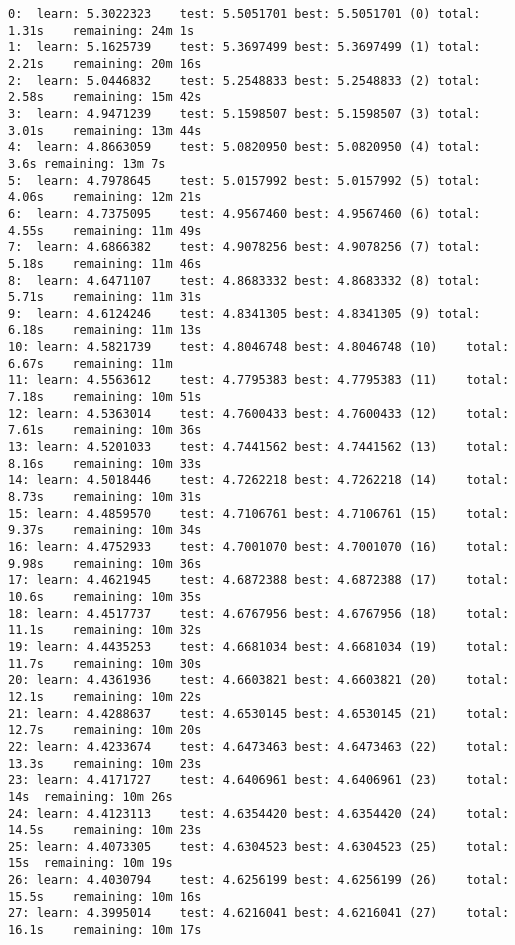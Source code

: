 \documentclass[11pt]{article}
\begin{document}
    \begin{Verbatim}[commandchars=\\\{\}]
0:	learn: 5.3022323	test: 5.5051701	best: 5.5051701 (0)	total: 1.31s	remaining: 24m 1s
1:	learn: 5.1625739	test: 5.3697499	best: 5.3697499 (1)	total: 2.21s	remaining: 20m 16s
2:	learn: 5.0446832	test: 5.2548833	best: 5.2548833 (2)	total: 2.58s	remaining: 15m 42s
3:	learn: 4.9471239	test: 5.1598507	best: 5.1598507 (3)	total: 3.01s	remaining: 13m 44s
4:	learn: 4.8663059	test: 5.0820950	best: 5.0820950 (4)	total: 3.6s	remaining: 13m 7s
5:	learn: 4.7978645	test: 5.0157992	best: 5.0157992 (5)	total: 4.06s	remaining: 12m 21s
6:	learn: 4.7375095	test: 4.9567460	best: 4.9567460 (6)	total: 4.55s	remaining: 11m 49s
7:	learn: 4.6866382	test: 4.9078256	best: 4.9078256 (7)	total: 5.18s	remaining: 11m 46s
8:	learn: 4.6471107	test: 4.8683332	best: 4.8683332 (8)	total: 5.71s	remaining: 11m 31s
9:	learn: 4.6124246	test: 4.8341305	best: 4.8341305 (9)	total: 6.18s	remaining: 11m 13s
10:	learn: 4.5821739	test: 4.8046748	best: 4.8046748 (10)	total: 6.67s	remaining: 11m
11:	learn: 4.5563612	test: 4.7795383	best: 4.7795383 (11)	total: 7.18s	remaining: 10m 51s
12:	learn: 4.5363014	test: 4.7600433	best: 4.7600433 (12)	total: 7.61s	remaining: 10m 36s
13:	learn: 4.5201033	test: 4.7441562	best: 4.7441562 (13)	total: 8.16s	remaining: 10m 33s
14:	learn: 4.5018446	test: 4.7262218	best: 4.7262218 (14)	total: 8.73s	remaining: 10m 31s
15:	learn: 4.4859570	test: 4.7106761	best: 4.7106761 (15)	total: 9.37s	remaining: 10m 34s
16:	learn: 4.4752933	test: 4.7001070	best: 4.7001070 (16)	total: 9.98s	remaining: 10m 36s
17:	learn: 4.4621945	test: 4.6872388	best: 4.6872388 (17)	total: 10.6s	remaining: 10m 35s
18:	learn: 4.4517737	test: 4.6767956	best: 4.6767956 (18)	total: 11.1s	remaining: 10m 32s
19:	learn: 4.4435253	test: 4.6681034	best: 4.6681034 (19)	total: 11.7s	remaining: 10m 30s
20:	learn: 4.4361936	test: 4.6603821	best: 4.6603821 (20)	total: 12.1s	remaining: 10m 22s
21:	learn: 4.4288637	test: 4.6530145	best: 4.6530145 (21)	total: 12.7s	remaining: 10m 20s
22:	learn: 4.4233674	test: 4.6473463	best: 4.6473463 (22)	total: 13.3s	remaining: 10m 23s
23:	learn: 4.4171727	test: 4.6406961	best: 4.6406961 (23)	total: 14s	remaining: 10m 26s
24:	learn: 4.4123113	test: 4.6354420	best: 4.6354420 (24)	total: 14.5s	remaining: 10m 23s
25:	learn: 4.4073305	test: 4.6304523	best: 4.6304523 (25)	total: 15s	remaining: 10m 19s
26:	learn: 4.4030794	test: 4.6256199	best: 4.6256199 (26)	total: 15.5s	remaining: 10m 16s
27:	learn: 4.3995014	test: 4.6216041	best: 4.6216041 (27)	total: 16.1s	remaining: 10m 17s

\end{Verbatim}
\end{document}
